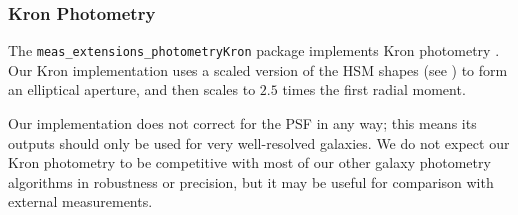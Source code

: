 \subsubsection{Kron Photometry}
\label{sec:kron}

The \texttt{meas\_extensions\_photometryKron} package implements Kron photometry \citep{1980ApJS...43..305K}.
Our Kron implementation uses a scaled version of the HSM shapes (see ) to form an elliptical aperture, and then scales to $2.5$ times the first radial moment.

Our implementation does not correct for the PSF in any way; this means its outputs should only be used for very well-resolved galaxies.
We do not expect our Kron photometry to be competitive with most of our other galaxy photometry algorithms in robustness or precision, but it may be useful for comparison with external measurements.
